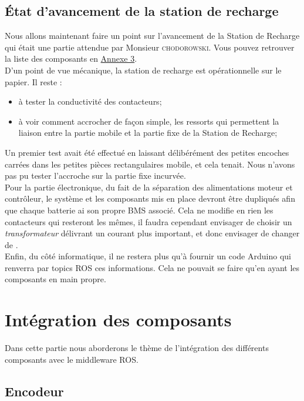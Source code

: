 \documentclass[french]{rapportENSTAB}
\begin{document}
\subsection{État d'avancement de la station de recharge} \label{station}
Nous allons maintenant faire un point sur l'avancement  de la Station de Recharge qui était une partie attendue par Monsieur \textsc{chodorowski}. Vous pouvez retrouver la liste des composants en \hyperlink{annexe3}{Annexe 3}.\\

D'un point de vue mécanique, la station de recharge est opérationnelle sur le papier. Il reste : \begin{itemize}[label=\textbullet, font=\small\color{blue}]
    \item à tester la conductivité des contacteurs;
    \item à voir comment accrocher de façon simple, les ressorts qui permettent la liaison entre la partie mobile et la partie fixe de la Station de Recharge;
\end{itemize} 
Un premier test avait été effectué en laissant délibérément des petites encoches carrées dans les petites pièces rectangulaires mobile, et cela tenait. Nous n'avons pas pu tester l'accroche sur la partie fixe incurvée.\\

Pour la partie électronique, du fait de la séparation des alimentations moteur et contrôleur, le système et les composants mis en place devront être dupliqués afin que chaque batterie ai son propre BMS associé. Cela ne modifie en rien les contacteurs qui resteront les mêmes, il faudra cependant envisager de choisir un \textit{transformateur} délivrant un courant plus important, et donc envisager de changer de .\\

Enfin, du côté informatique, il ne restera plus qu'à fournir un code Arduino qui renverra par topics ROS ces informations. Cela ne pouvait se faire qu'en ayant les composants en main propre.

\pagebreak
\section{Intégration des composants}
Dans cette partie nous aborderons le thème de l'intégration des différents composants avec le middleware ROS.


\subsection{Encodeur}
\end{document}
